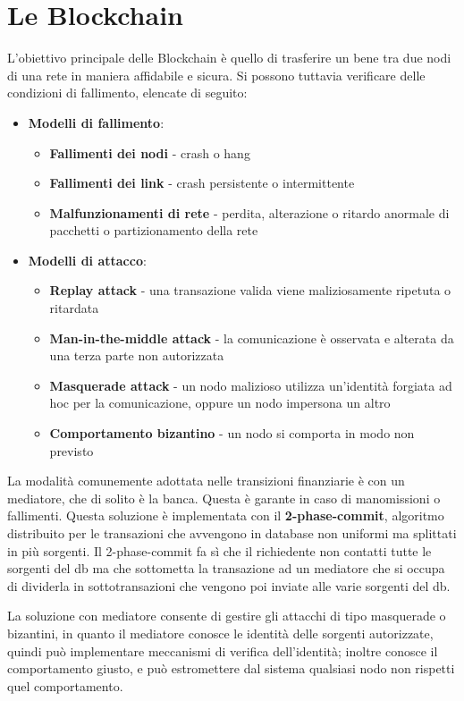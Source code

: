 \chapter{Le Blockchain}
L'obiettivo principale delle Blockchain è quello di trasferire un bene tra due nodi di una rete in maniera affidabile e sicura. Si possono tuttavia verificare delle condizioni di fallimento, elencate di seguito:
\begin{itemize}
    \item \textbf{Modelli di fallimento}:
    \begin{itemize}
        \item \textbf{Fallimenti dei nodi} - crash o hang
        \item \textbf{Fallimenti dei link} - crash persistente o intermittente
        \item \textbf{Malfunzionamenti di rete} - perdita, alterazione o ritardo anormale di pacchetti o partizionamento della rete
    \end{itemize}
    \item \textbf{Modelli di attacco}:
    \begin{itemize}
        \item \textbf{Replay attack} - una transazione valida viene maliziosamente ripetuta o ritardata
        \item \textbf{Man-in-the-middle attack} - la comunicazione è osservata e alterata da una terza parte non autorizzata
        \item \textbf{Masquerade attack} - un nodo malizioso utilizza un'identità forgiata ad hoc per la comunicazione, oppure un nodo impersona un altro
        \item \textbf{Comportamento bizantino} - un nodo si comporta in modo non previsto
    \end{itemize}
\end{itemize}
La modalità comunemente adottata nelle transizioni finanziarie è con un mediatore, che di solito è la banca. Questa è garante in caso di manomissioni o fallimenti. Questa soluzione è implementata con il \textbf{2-phase-commit}, algoritmo distribuito per le transazioni che avvengono in database non uniformi ma splittati in più sorgenti. Il 2-phase-commit fa sì che il richiedente non contatti tutte le sorgenti del db ma che sottometta la transazione ad un mediatore che si occupa di dividerla in sottotransazioni che vengono poi inviate alle varie sorgenti del db. 

La soluzione con mediatore consente di gestire gli attacchi di tipo masquerade o bizantini, in quanto il mediatore conosce le identità delle sorgenti autorizzate, quindi può implementare meccanismi di verifica dell'identità; inoltre conosce il comportamento giusto, e può estromettere dal sistema qualsiasi nodo non rispetti quel comportamento.


